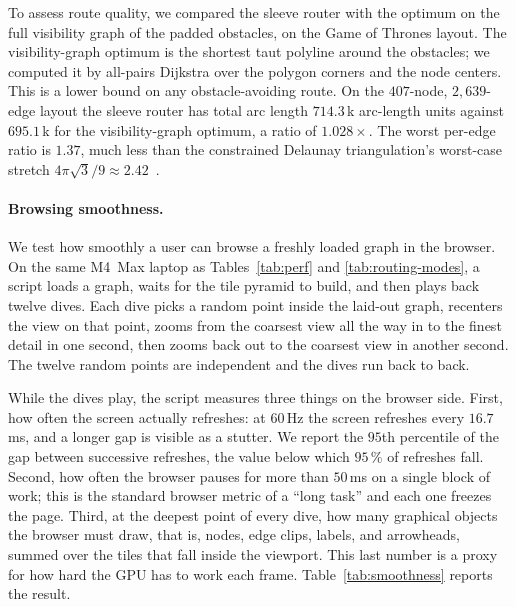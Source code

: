\documentclass[a4paper,USenglish,anonymous]{gd-lipics-v3}
\begin{document}
To assess route quality, we compared the sleeve router with the
optimum on the full visibility graph of the padded obstacles, on the
Game of Thrones layout. The visibility-graph optimum is the shortest
taut polyline around the obstacles; we computed it by all-pairs
Dijkstra over the polygon corners and the node centers. This is a
lower bound on any obstacle-avoiding route. On the $407$-node,
$2{,}639$-edge layout the sleeve router has total arc length
$714.3$\,k arc-length units against $695.1$\,k for the
visibility-graph optimum, a ratio of $1.028\times$. The worst
per-edge ratio is $1.37$, much less than the constrained Delaunay
triangulation's worst-case stretch $4\pi\sqrt{3}/9 \approx
2.42$~\cite{bose2006stretch}.

\paragraph{Browsing smoothness.}
We test how smoothly a user can browse a freshly loaded graph in the
browser. On the same M4~Max laptop as Tables~\ref{tab:perf} and
\ref{tab:routing-modes}, a script loads a graph, waits for the tile
pyramid to build, and then plays back twelve dives. Each dive picks
a random point inside the laid-out graph, recenters the view on that
point, zooms from the coarsest view all the way in to the finest
detail in one second, then zooms back out to the coarsest view in
another second. The twelve random points are independent and the
dives run back to back.

While the dives play, the script measures three things on the
browser side. First, how often the screen actually refreshes: at
$60$\,Hz the screen refreshes every $16.7$\,ms, and a longer gap is
visible as a stutter. We report the $95$th percentile of the gap
between successive refreshes, the value below which $95\,\%$ of
refreshes fall. Second, how often the browser pauses for more than
$50$\,ms on a single block of work; this is the standard browser
metric of a ``long task'' and each one freezes the page. Third, at
the deepest point of every dive, how many graphical objects the
browser must draw, that is, nodes, edge clips, labels, and
arrowheads, summed over the tiles that fall inside the viewport.
This last number is a proxy for how hard the GPU has to work each
frame. Table~\ref{tab:smoothness} reports the result.
\end{document}
